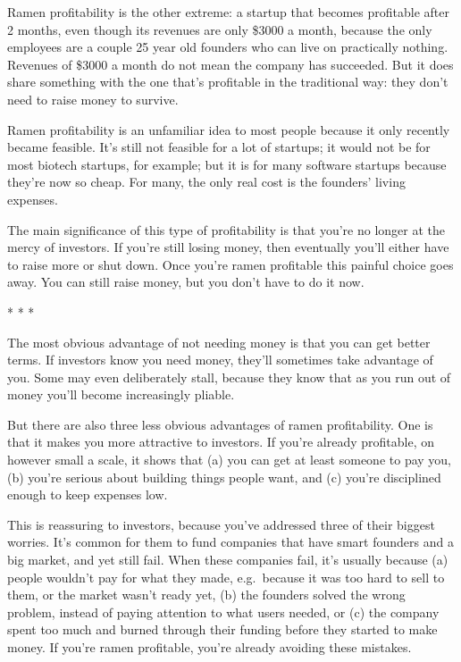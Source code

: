 Ramen profitability is the other extreme: a startup that becomes
profitable after 2 months, even though its revenues are only \$3000 a
month, because the only employees are a couple 25 year old founders who
can live on practically nothing. Revenues of \$3000 a month do not mean
the company has succeeded. But it does share something with the one
that's profitable in the traditional way: they don't need to raise money
to survive.

Ramen profitability is an unfamiliar idea to most people because it only
recently became feasible. It's still not feasible for a lot of startups;
it would not be for most biotech startups, for example; but it is for
many software startups because they're now so cheap. For many, the only
real cost is the founders' living expenses.

The main significance of this type of profitability is that you're no
longer at the mercy of investors. If you're still losing money, then
eventually you'll either have to raise more or shut down. Once you're
ramen profitable this painful choice goes away. You can still raise
money, but you don't have to do it now.

* * *

The most obvious advantage of not needing money is that you can get
better terms. If investors know you need money, they'll sometimes take
advantage of you. Some may even deliberately stall, because they know
that as you run out of money you'll become increasingly pliable.

But there are also three less obvious advantages of ramen profitability.
One is that it makes you more attractive to investors. If you're already
profitable, on however small a scale, it shows that (a) you can get at
least someone to pay you, (b) you're serious about building things
people want, and (c) you're disciplined enough to keep expenses low.

This is reassuring to investors, because you've addressed three of their
biggest worries. It's common for them to fund companies that have smart
founders and a big market, and yet still fail. When these companies
fail, it's usually because (a) people wouldn't pay for what they made,
e.g.~because it was too hard to sell to them, or the market wasn't ready
yet, (b) the founders solved the wrong problem, instead of paying
attention to what users needed, or (c) the company spent too much and
burned through their funding before they started to make money. If
you're ramen profitable, you're already avoiding these mistakes.

